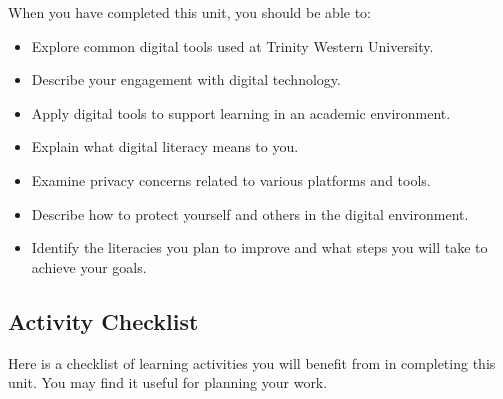 \documentclass[
]{book}
\providecommand{\tightlist}{%
  \setlength{\itemsep}{0pt}\setlength{\parskip}{0pt}}
\theoremstyle{definition}
\theoremstyle{definition}
\theoremstyle{definition}
\theoremstyle{definition}
\theoremstyle{remark}
\begin{document}
When you have completed this unit, you should be able to:

\begin{itemize}
\tightlist
\item
  Explore common digital tools used at Trinity Western University.\\
\item
  Describe your engagement with digital technology.\\
\item
  Apply digital tools to support learning in an academic environment.\\
\item
  Explain what digital literacy means to you.\\
\item
  Examine privacy concerns related to various platforms and tools.\\
\item
  Describe how to protect yourself and others in the digital environment.\\
\item
  Identify the literacies you plan to improve and what steps you will take to achieve your goals.
\end{itemize}

\hypertarget{activity-checklist}{%
\subsection*{Activity Checklist}\label{activity-checklist}}

Here is a checklist of learning activities you will benefit from in completing this unit. You may find it useful for planning your work.
\end{document}
